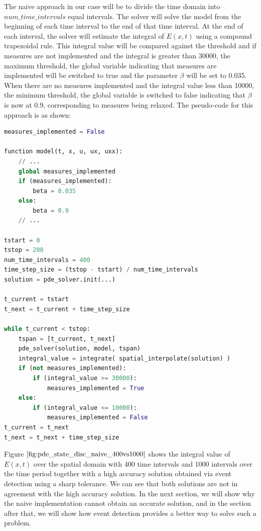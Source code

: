 \documentclass{article}
\begin{document}
The naive approach in our case will be to divide the time domain into $num\_time\_intervals$ equal intervals. The solver will solve the model from the beginning of each time interval to the end of that time interval. At the end of each interval, the solver will estimate the integral of $E(x, t)$ using a compound trapezoidal rule. This integral value will be compared against the threshold and if measures are not implemented and the integral is greater than 30000, the maximum threshold, the global variable indicating that measures are implemented will be switched to true and the parameter $\beta$ will be set to 0.035. When there are no measures implemented and the integral value less than 10000, the minimum threshold, the global variable is switched to false indicating that $\beta$ is now at 0.9, corresponding to measures being relaxed. The pseudo-code for this approach is as shown:

\begin{minipage}{\linewidth}
\begin{lstlisting}[language=Python]
measures_implemented = False

function model(t, x, u, ux, uxx):
	// ...
	global measures_implemented
	if (measures_implemented):
		beta = 0.035
	else:
		beta = 0.9
	// ...

tstart = 0
tstop = 200
num_time_intervals = 400
time_step_size = (tstop - tstart) / num_time_intervals
solution = pde_solver.init(...)

t_current = tstart
t_next = t_current + time_step_size

while t_current < tstop:
	tspan = [t_current, t_next]
	pde_solver(solution, model, tspan)
	integral_value = integrate( spatial_interpolate(solution) )
	if (not measures_implemented):
		if (integral_value >= 30000): 
			measures_implemented = True
	else:
		if (integral_value <= 10000):
			measures_implemented = False
t_current = t_next
t_next = t_next + time_step_size
\end{lstlisting}
\end{minipage} 

Figure $\ref{fig:pde_state_disc_naive_400vs1000}$ shows the integral value of $E(x, t)$ over the spatial domain with 400 time intervals and 1000 intervals over the time period together with a high accuracy solution obtained via event detection using a sharp tolerance. We can see that both solutions are not in agreement with the high accuracy solution. In the next section, we will show why the naive implementation cannot obtain an accurate solution, and in the section after that, we will show how event detection provides a better way to solve such a problem.
\end{document}
